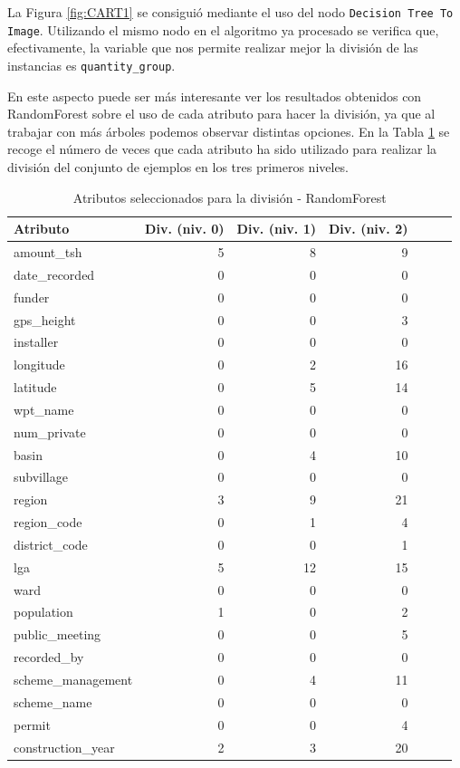 \documentclass[a4paper, 20pt]{article}
\begin{document}
La Figura \ref{fig:CART1} se consiguió mediante el uso del nodo \texttt{Decision Tree To Image}. Utilizando el mismo nodo en el algoritmo ya procesado se verifica que, efectivamente, la variable que nos permite realizar mejor la división de las instancias es \texttt{quantity\_group}.

En este aspecto puede ser más interesante ver los resultados obtenidos con RandomForest sobre el uso de cada atributo para hacer la división, ya que al trabajar con más árboles podemos observar distintas opciones. En la Tabla \ref{tab:RFatrib} se recoge el número de veces que cada atributo ha sido utilizado para realizar la división del conjunto de ejemplos en los tres primeros niveles.

\begin{table}[H]
\centering
\caption{Atributos seleccionados para la división - RandomForest}
\label{tab:RFatrib}
\begin{tabular}{lrrrrrr}
\toprule
Atributo & Div. (niv. 0) & Div. (niv. 1) & Div. (niv. 2) \\ \midrule
amount\_tsh & 5 & 8 & 9 \\
date\_recorded & 0 & 0 & 0 \\
funder & 0 & 0 & 0 \\
gps\_height & 0 & 0 & 3 \\
installer & 0 & 0 & 0 \\
longitude & 0 & 2 & 16 \\
latitude & 0 & 5 & 14 \\
wpt\_name & 0 & 0 & 0 \\
num\_private & 0 & 0 & 0 \\
basin & 0 & 4 & 10 \\
subvillage & 0 & 0 & 0 \\
region & 3 & 9 & 21 \\
region\_code & 0 & 1 & 4 \\
district\_code & 0 & 0 & 1 \\
lga & 5 & 12 & 15 \\
ward & 0 & 0 & 0 \\
population & 1 & 0 & 2 \\
public\_meeting & 0 & 0 & 5 \\
recorded\_by & 0 & 0 & 0 \\
scheme\_management & 0 & 4 & 11 \\
scheme\_name & 0 & 0 & 0 \\
permit & 0 & 0 & 4 \\
construction\_year & 2 & 3 & 20 \\

\end{tabular}
\end{table}
\end{document}
